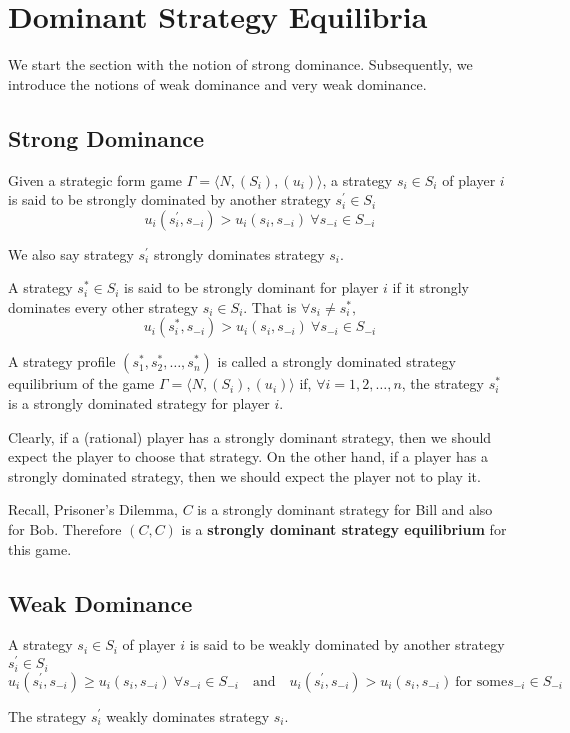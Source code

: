 \section{Dominant Strategy Equilibria}
We start the section with the notion of strong dominance.
Subsequently, we introduce the notions of weak dominance and very weak dominance.
\subsection{Strong Dominance}
\begin{defn}
    Given a strategic form game $\Gamma = \langle N,(S_i),(u_i)\rangle$, a strategy $s_i \in S_i$ of player $i$ is said to be strongly dominated by another strategy $s^\prime_i \in S_i$
    \[u_i(s^\prime_i,s_{-i})> u_i(s_i,s_{-i})\ \forall s_{-i} \in S_{-i}\]
\end{defn}
We also say strategy $s^\prime_i$ strongly dominates strategy $s_i$.
\begin{defn}
    A strategy $s^*_i \in S_i$ is said to be strongly dominant for player $i$ if it strongly dominates every other strategy $s_i \in S_i$.
    That is $\forall s_i\neq s_i^*,$
    \[u_i(s^*_i,s_{-i})> u_i(s_i,s_{-i})\ \forall s_{-i} \in S_{-i}\]
\end{defn}
\begin{defn}
    A strategy profile $(s_1^*,s_2^*,\ldots,s_n^*)$ is called a strongly dominated strategy equilibrium of the game $\Gamma = \langle N,(S_i),(u_i)\rangle$ if, $\forall i=1,2,\ldots,n$, the strategy $s_i^*$ is a strongly dominated strategy for player $i$.
\end{defn}
Clearly, if a (rational) player has a strongly dominant strategy, then we should expect the player to choose that strategy.
On the other hand, if a player has a strongly dominated strategy, then we should expect the player not to play it.

Recall, Prisoner's Dilemma, $C$ is a strongly dominant strategy for Bill and also for Bob. Therefore $(C, C)$ is a \textbf{strongly dominant strategy equilibrium} for this game.
\subsection{Weak Dominance}
\begin{defn}
    A strategy $s_i \in S_i$ of player $i$ is said to be weakly dominated by another strategy $s^\prime_i \in S_i$
    \[u_i(s^\prime_i,s_{-i})\geq u_i(s_i,s_{-i})\ \forall s_{-i} \in S_{-i}\quad \text{and}\quad u_i(s^\prime_i,s_{-i})> u_i(s_i,s_{-i})\ \text{for some} s_{-i} \in S_{-i}\]
\end{defn}
The strategy $s^\prime_i$ weakly dominates strategy $s_i$.


